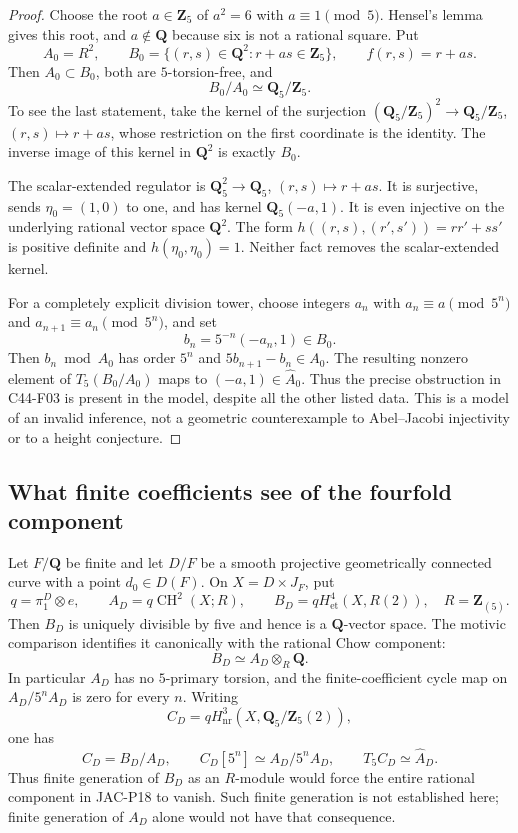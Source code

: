 \begin{proof}
Choose the root $a\in\mathbf Z_5$ of $a^2=6$ with $a\equiv1\pmod5$.
Hensel's lemma gives this root, and $a\notin\mathbf Q$ because
six is not a rational square.  Put
\[
 A_0=R^2,\qquad
 B_0=\{(r,s)\in\mathbf Q^2:r+as\in\mathbf Z_5\},
 \qquad f(r,s)=r+as.
\]
Then $A_0\subset B_0$, both are $5$-torsion-free, and
\[
  B_0/A_0\simeq\mathbf Q_5/\mathbf Z_5.
 \tag{F05.1}
\]
To see the last statement, take the kernel of the surjection
$(\mathbf Q_5/\mathbf Z_5)^2\to\mathbf Q_5/\mathbf Z_5$,
$(r,s)\mapsto r+as$, whose restriction on the first coordinate
is the identity.  The inverse image of this kernel in
$\mathbf Q^2$ is exactly $B_0$.

The scalar-extended regulator is
$\mathbf Q_5^2\to\mathbf Q_5$, $(r,s)\mapsto r+as$.
It is surjective, sends $\eta_0=(1,0)$ to one, and has kernel
$\mathbf Q_5(-a,1)$.  It is even injective on the underlying
rational vector space $\mathbf Q^2$.  The form
$h((r,s),(r',s'))=rr'+ss'$ is positive definite and
$h(\eta_0,\eta_0)=1$.  Neither fact removes the scalar-extended
kernel.

For a completely explicit division tower, choose integers $a_n$
with $a_n\equiv a\pmod{5^n}$ and
$a_{n+1}\equiv a_n\pmod{5^n}$, and set
\[
 b_n=5^{-n}(-a_n,1)\in B_0.
\]
Then $b_n\bmod A_0$ has order $5^n$ and
$5b_{n+1}-b_n\in A_0$.  The resulting nonzero element of
$T_5(B_0/A_0)$ maps to $(-a,1)\in\widehat A_0$.
Thus the precise obstruction in C44-F03 is present in the
model, despite all the other listed data.  This is a model of
an invalid inference, not a geometric counterexample to
Abel--Jacobi injectivity or to a height conjecture.
\end{proof}

\subsection{What finite coefficients see of the fourfold component}

\begin{proposition}[C44-F06]\label{C44-F06}
Let $F/\mathbf Q$ be finite and let $D/F$ be a smooth projective
geometrically connected curve with a point $d_0\in D(F)$.
On $X=D\times J_F$, put
\[
 q=\pi_1^D\otimes e,\qquad
 A_D=q\operatorname{CH}^2(X;R),\qquad
 B_D=qH^4_{\mathrm{et}}(X,R(2)),
 \quad R=\mathbf Z_{(5)}.
\]
Then $B_D$ is uniquely divisible by five and hence is a
$\mathbf Q$-vector space.  The motivic comparison identifies it
canonically with the rational Chow component:
\[
       B_D\simeq A_D\otimes_R\mathbf Q.
                                                        \tag{F06.1}
\]
In particular $A_D$ has no $5$-primary torsion, and the
finite-coefficient cycle map on $A_D/5^nA_D$ is zero for every $n$.
Writing
\[
 C_D=qH^3_{\mathrm{nr}}(X,\mathbf Q_5/\mathbf Z_5(2)),
\]
one has
\[
 C_D=B_D/A_D,\qquad
 C_D[5^n]\simeq A_D/5^nA_D,
 \qquad T_5C_D\simeq\widehat A_D.             \tag{F06.2}
\]
Thus finite generation of $B_D$ as an $R$-module would force
the entire rational component in JAC-P18 to vanish.  Such finite
generation is not established here; finite generation of $A_D$
alone would not have that consequence.
\end{proposition}

